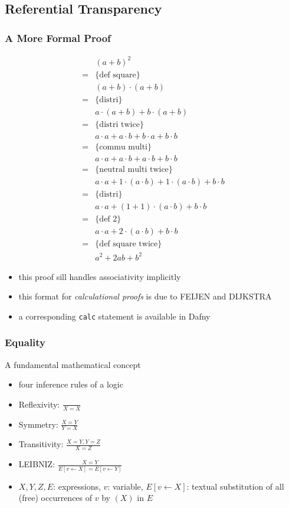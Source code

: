 \begin{multicols}{2}
\subsection{Referential Transparency}
\subsubsection{A More Formal Proof}
\begin{align*}
&(a+b)^2\\
=& \{ \text{def square} \}\\
&(a+b) \cdot (a+b)\\
=& \{ \text{distri}\}\\
&a \cdot (a+b) + b \cdot (a+b)\\
=& \{ \text{distri twice}\}\\
&a \cdot a + a \cdot b + b \cdot a + b \cdot b\\
=& \{ \text{commu multi}\}\\
&a \cdot a + a \cdot b + a \cdot b + b \cdot b\\
=& \{ \text{neutral multi twice}\}\\
&a \cdot a + 1 \cdot (a \cdot b) + 1 \cdot (a \cdot b) + b \cdot b\\
=& \{ \text{distri}\}\\
&a \cdot a + (1 + 1) \cdot (a \cdot b) + b \cdot b\\
=& \{ \text{def 2}\}\\
&a \cdot a + 2 \cdot (a \cdot b) + b \cdot b\\
=& \{ \text{def square twice}\}\\
&a^2 + 2ab + b^2
\end{align*}
\begin{itemize}
  \item this proof sill handles associativity implicitly
  \item this format for \textit{calculational proofs} is due to FEIJEN and DIJKSTRA
  \item a corresponding \texttt{calc} statement is available in Dafny
\end{itemize}

\subsubsection{Equality}
A fundamental mathematical concept
\begin{itemize}
  \item four inference rules of a logic
  \item Reflexivity: $\frac{}{X=X}$
  \item Symmetry: $\frac{X=Y}{Y=X}$
  \item Transitivity: $\frac{X=Y,Y=Z}{X=Z}$
  \item LEIBNIZ: $\frac{X=Y}{E[v\leftarrow X]=E[v\leftarrow Y]}$
  \item $X,Y,Z,E$: expressions, $v$: variable, $E[v\leftarrow X]$: textual substitution of all (free) occurrences of $v$ by $(X)$ in $E$
\end{itemize}


\end{multicols}
